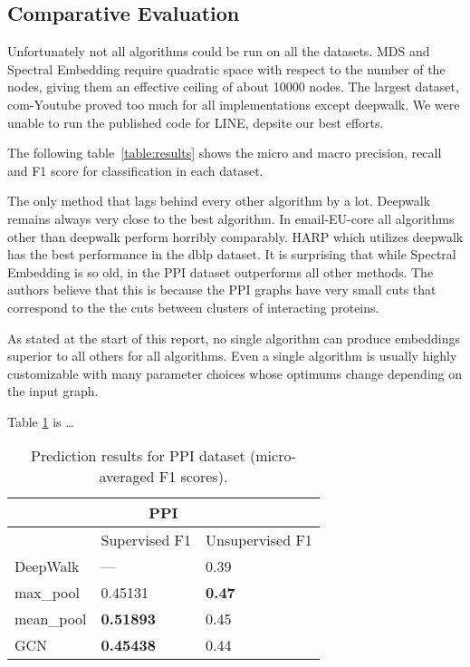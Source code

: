 \subsection{Comparative Evaluation}

Unfortunately not all algorithms could be run on all the datasets. MDS and Spectral Embedding
require quadratic space with respect to the number of the nodes, giving them an effective ceiling of
about 10000 nodes. The largest dataset, com-Youtube proved too much for all implementations except
deepwalk. We were unable to run the published code for LINE, depsite our best efforts.

The following table~\ref{table:results} shows the micro and macro precision, recall and F1 score for
classification in each dataset.



The only method that lags behind every other algorithm by a lot. Deepwalk remains always very close
to the best algorithm. In email-EU-core all algorithms other than deepwalk perform horribly
comparably. HARP which utilizes deepwalk has the best performance in the dblp dataset. It is
surprising that while Spectral Embedding is so old, in the PPI dataset outperforms all other
methods. The authors believe that this is because the PPI graphs have very small cuts that
correspond to the the cuts between clusters of interacting proteins.

As stated at the start of this report, no single algorithm can produce embeddings superior to all
others for all algorithms. Even a single algorithm is usually highly customizable with many
parameter choices whose optimums change depending on the input graph.



Table \ref{table:1} is \dots
\begin{table}[h!]
\centering
\caption{Prediction results for PPI dataset (micro-averaged F1 scores). \newline}
\begin{tabular}{|p{3cm}||p{3cm}|p{3cm}|}
 \hline
 \multicolumn{3}{|c|}{\textbf{PPI}} \\
 \hline
 & Supervised F1 &Unsupervised F1\\
 \hline\hline
 DeepWalk   & ---    &0.39\\
 max\_pool &   0.45131  & \textbf{0.47} \\
 mean\_pool &\textbf{0.51893} & 0.45\\
 GCN    &\textbf{0.45438} & 0.44\\
 \hline
\end{tabular}\\
\label{table:1}
\end{table}

